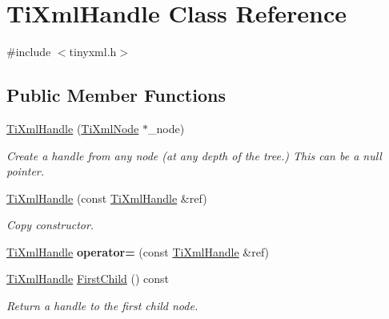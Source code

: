 \hypertarget{classTiXmlHandle}{}\section{Ti\+Xml\+Handle Class Reference}
\label{classTiXmlHandle}


{\ttfamily \#include $<$tinyxml.\+h$>$}

\subsection*{Public Member Functions}
\begin{DoxyCompactItemize}
\item 
\mbox{\label{classTiXmlHandle_aba18fd7bdefb942ecdea4bf4b8e29ec8}} 
\hyperlink{classTiXmlHandle_aba18fd7bdefb942ecdea4bf4b8e29ec8}{Ti\+Xml\+Handle} (\hyperlink{classTiXmlNode}{Ti\+Xml\+Node} $\ast$\+\_\+node)
\begin{DoxyCompactList}\small\item\em Create a handle from any node (at any depth of the tree.) This can be a null pointer. \end{DoxyCompactList}\item 
\mbox{\label{classTiXmlHandle_a236d7855e1e56ccc7b980630c48c7fd7}} 
\hyperlink{classTiXmlHandle_a236d7855e1e56ccc7b980630c48c7fd7}{Ti\+Xml\+Handle} (const \hyperlink{classTiXmlHandle}{Ti\+Xml\+Handle} \&ref)
\begin{DoxyCompactList}\small\item\em Copy constructor. \end{DoxyCompactList}\item 
\mbox{\label{classTiXmlHandle_ad8e5dcf6a87882674203157f29f8e4db}} 
\hyperlink{classTiXmlHandle}{Ti\+Xml\+Handle} {\bfseries operator=} (const \hyperlink{classTiXmlHandle}{Ti\+Xml\+Handle} \&ref)
\item 
\mbox{\label{classTiXmlHandle_afb1b4c0eda970b320dfd262304cc1d04}} 
\hyperlink{classTiXmlHandle}{Ti\+Xml\+Handle} \hyperlink{classTiXmlHandle_afb1b4c0eda970b320dfd262304cc1d04}{First\+Child} () const
\begin{DoxyCompactList}\small\item\em Return a handle to the first child node. \end{DoxyCompactList}\item 

\end{DoxyCompactItemize}
